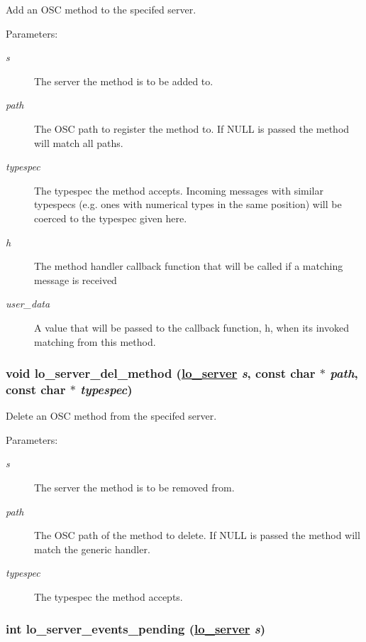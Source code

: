 Add an OSC method to the specifed server. 

\begin{Desc}
\item[Parameters:]
\begin{description}
\item[{\em s}]The server the method is to be added to. \item[{\em path}]The OSC path to register the method to. If NULL is passed the method will match all paths. \item[{\em typespec}]The typespec the method accepts. Incoming messages with similar typespecs (e.g. ones with numerical types in the same position) will be coerced to the typespec given here. \item[{\em h}]The method handler callback function that will be called if a matching message is received \item[{\em user\_\-data}]A value that will be passed to the callback function, h, when its invoked matching from this method. \end{description}
\end{Desc}
\hypertarget{group__liblolowlevel_gf834a6d62de7dcceaede62325e74c763}{
\subsubsection[lo\_\-server\_\-del\_\-method]{\setlength{\rightskip}{0pt plus 5cm}void lo\_\-server\_\-del\_\-method (\hyperlink{lo__types_8h_59067bf50cf8abb4371da6f03c9036c9}{lo\_\-server} {\em s}, const char $\ast$ {\em path}, const char $\ast$ {\em typespec})}}
\label{group__liblolowlevel_gf834a6d62de7dcceaede62325e74c763}


Delete an OSC method from the specifed server. 

\begin{Desc}
\item[Parameters:]
\begin{description}
\item[{\em s}]The server the method is to be removed from. \item[{\em path}]The OSC path of the method to delete. If NULL is passed the method will match the generic handler. \item[{\em typespec}]The typespec the method accepts. \end{description}
\end{Desc}
\hypertarget{group__liblolowlevel_g04feb1063c3f4df6fec41405b28dd99a}{
\subsubsection[lo\_\-server\_\-events\_\-pending]{\setlength{\rightskip}{0pt plus 5cm}int lo\_\-server\_\-events\_\-pending (\hyperlink{lo__types_8h_59067bf50cf8abb4371da6f03c9036c9}{lo\_\-server} {\em s})}}
\label{group__liblolowlevel_g04feb1063c3f4df6fec41405b28dd99a}


